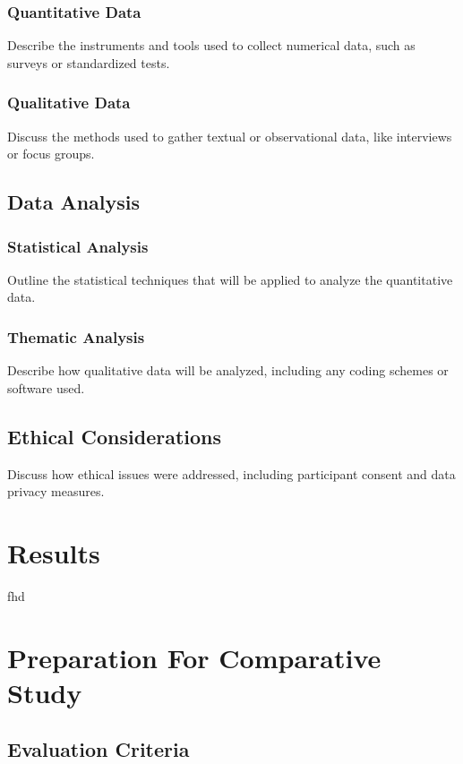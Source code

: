 \subsubsection{Quantitative Data}
Describe the instruments and tools used to collect numerical data, such as surveys or standardized tests.
\subsubsection{Qualitative Data}
Discuss the methods used to gather textual or observational data, like interviews or focus groups.

\subsection{Data Analysis}
\subsubsection{Statistical Analysis}
Outline the statistical techniques that will be applied to analyze the quantitative data.
\subsubsection{Thematic Analysis}
Describe how qualitative data will be analyzed, including any coding schemes or software used.

\subsection{Ethical Considerations}
Discuss how ethical issues were addressed, including participant consent and data privacy measures.

\section{Results} %


fhd


\section{Preparation For Comparative Study}
\label{ComparativeStudy}

\subsection{Evaluation Criteria }
\label{Data preparation}    

